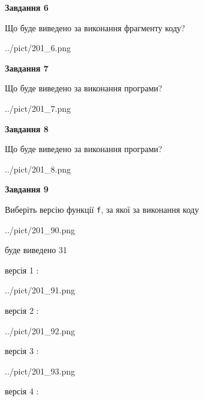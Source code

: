 \documentclass[12pt, ukrainian]{article}
\def\code#1{\Verb!#1!}
\begin{document}
{\begin {large}
{\begin {center}\textbf{Завдання 6}\end {center}}

Що буде виведено за виконання фрагменту коду?\par
\begin{center}
	{../pict/201_6.png}
\end{center}
\newpage

{\begin {center}\textbf{Завдання 7}\end {center}}

Що буде виведено за виконання програми?\par
\begin{center}
	{../pict/201_7.png}
\end{center}
\newpage

{\begin {center}\textbf{Завдання 8}\end {center}}

Що буде виведено за виконання програми?\par
\begin{center}
	{../pict/201_8.png}
\end{center}
\newpage

{\begin {center}\textbf{Завдання 9}\end {center}}

Виберіть версію функції \code{f}, за якої за виконання коду
\begin{center}
	{../pict/201_90.png}
\end{center}
буде виведено 31

\vspace{5mm}
версія 1 :

\begin{center}
	{../pict/201_91.png}
\end{center}
версія 2 :

\begin{center}
	{../pict/201_92.png}
\end{center}
версія 3 :

\begin{center}
	{../pict/201_93.png}
\end{center}
версія 4 :


\end{large}}
\end{document}
